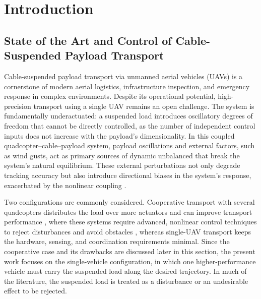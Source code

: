 \documentclass[sn-mathphys-num]{sn-jnl}
\theoremstyle{thmstyleone}%
\theoremstyle{thmstyletwo}%
\theoremstyle{thmstylethree}%
\begin{document}
\section{Introduction}

\subsection{State of the Art and Control of Cable-Suspended Payload Transport}
Cable-suspended payload transport via unmanned aerial vehicles (UAVs) is a cornerstone of modern aerial logistics, infrastructure inspection, and emergency response in complex environments. Despite its operational potential, high-precision transport using a single UAV remains an open challenge. The system is fundamentally underactuated: a suspended load introduces oscillatory degrees of freedom that cannot be directly controlled, as the number of independent control inputs does not increase with the payload’s dimensionality. In this coupled quadcopter–cable–payload system, payload oscillations and external factors, such as wind gusts, act as primary sources of dynamic unbalanced that break the system’s natural equilibrium. These external perturbations not only degrade tracking accuracy but also introduce directional biases in the system's response, exacerbated by the nonlinear coupling \cite{Estevez2024,Wang2023,Yu2024,Mohammadi2021}.

Two configurations are commonly considered. Cooperative transport with several quadcopters distributes the load over more actuators and can improve transport performance \cite{Costantini2024,sun2025agile,di2026modeling}, where these systems require advanced, nonlinear control techniques to reject disturbances \cite{han2022controller} and avoid obstacles \cite{aliyu2022control}, whereas single-UAV transport keeps the hardware, sensing, and coordination requirements minimal. Since the cooperative case and its drawbacks are discussed later in this section, the present work focuses on the single-vehicle configuration, in which one higher-performance vehicle must carry the suspended load along the desired trajectory. In much of the literature, the suspended load is treated as a disturbance or an undesirable effect to be rejected.
\end{document}
